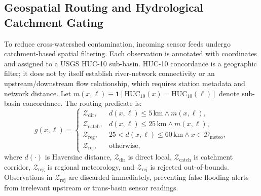 \documentclass[conference]{IEEEtran}
\begin{document}
\subsection{Geospatial Routing and Hydrological Catchment Gating}
To reduce cross-watershed contamination, incoming sensor feeds undergo catchment-based spatial filtering. Each observation is annotated with coordinates and assigned to a USGS HUC-10 sub-basin. HUC-10 concordance is a geographic filter; it does not by itself establish river-network connectivity or an upstream/downstream flow relationship, which requires station metadata and network distance. Let $m(x,\ell) \equiv \mathbf{1}[\mathrm{HUC}_{10}(x) = \mathrm{HUC}_{10}(\ell)]$ denote sub-basin concordance. The routing predicate is:
\begin{equation}
\label{eq:geo_gate}
g(x, \ell) =
\begin{cases}
\mathcal{Z}_{\mathrm{dir}}, & d(x,\ell) \le 5\,\text{km} \land m(x,\ell),\\[2pt]
\mathcal{Z}_{\mathrm{catch}}, & d(x,\ell) \le 25\,\text{km} \land m(x,\ell),\\[2pt]
\mathcal{Z}_{\mathrm{reg}}, & 25 < d(x,\ell) \le 60\,\text{km} \land x \in \mathcal{D}_{\mathrm{meteo}},\\[2pt]
\mathcal{Z}_{\mathrm{rej}}, & \text{otherwise,}
\end{cases}
\end{equation}
where $d(\cdot)$ is Haversine distance, $\mathcal{Z}_{\mathrm{dir}}$ is direct local, $\mathcal{Z}_{\mathrm{catch}}$ is catchment corridor, $\mathcal{Z}_{\mathrm{reg}}$ is regional meteorology, and $\mathcal{Z}_{\mathrm{rej}}$ is rejected out-of-bounds. Observations in $\mathcal{Z}_{\mathrm{rej}}$ are discarded immediately, preventing false flooding alerts from irrelevant upstream or trans-basin sensor readings.
\end{document}
